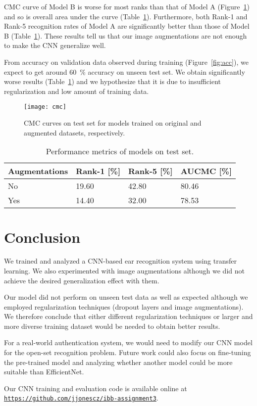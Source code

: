 \documentclass[9pt]{IEEEtran}
\begin{document}
CMC curve of Model B is worse for most ranks than that of Model A (Figure~\ref{fig:cmc}) and so is overall area under the curve (Table~\ref{tab:metrics}).
Furthermore, both Rank-1 and Rank-5 recognition rates of Model A are significantly better than those of Model B (Table~\ref{tab:metrics}).
These results tell us that our image augmentations are not enough to make the CNN generalize well.

From accuracy on validation data observed during training (Figure~\ref{fig:acc}), we expect to get around 60~\% accuracy on unseen test set.
We obtain significantly worse results (Table~\ref{tab:metrics}) and we hypothesize that it is due to insufficient regularization and low amount of training data.

\begin{figure}[ht]
    \centering
    \texttt{[image: cmc]}
    \caption{CMC curves on test set for models trained on original and augmented datasets, respectively.}
    \label{fig:cmc}
\end{figure}

\begin{table}[ht]
    \caption{Performance metrics of models on test set.}
    \label{tab:metrics}
    \centering
    \begin{tabular}{llll}
        Augmentations & Rank-1 [\%] & Rank-5 [\%] & AUCMC [\%] \\
        \hline
        No & 19.60 & 42.80 & 80.46 \\
        Yes & 14.40 & 32.00 & 78.53
    \end{tabular}
\end{table}

\section{Conclusion}

We trained and analyzed a CNN-based ear recognition system using transfer learning.
We also experimented with image augmentations although we did not achieve the desired generalization effect with them.

Our model did not perform on unseen test data as well as expected although we employed regularization techniques (dropout layers and image augmentations).
We therefore conclude that either different regularization techniques or larger and more diverse training dataset would be needed to obtain better results.

For a real-world authentication system, we would need to modify our CNN model for the open-set recognition problem.
Future work could also focus on fine-tuning the pre-trained model and analyzing whether another model could be more suitable than EfficientNet.

Our CNN training and evaluation code is available online at \texttt{\url{https://github.com/jjonescz/ibb-assignment3}}.



\end{document}
